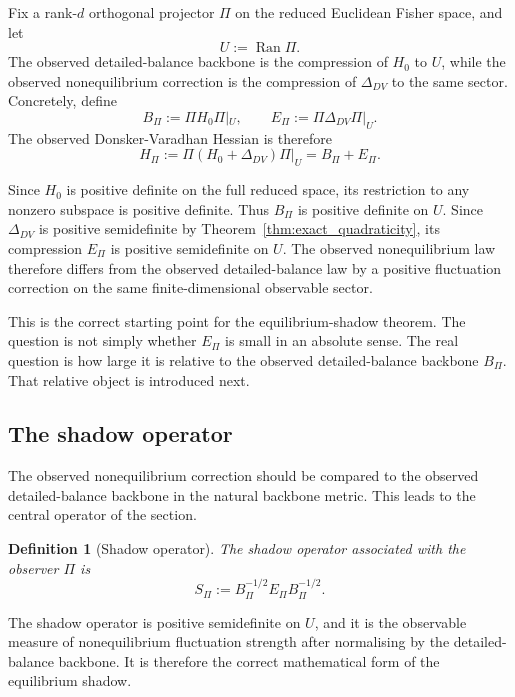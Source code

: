 \documentclass[11pt,a4paper]{article}
\numberwithin{equation}{section}
\theoremstyle{thmcompact}
\newtheorem{definition}[theorem]{Definition}
\theoremstyle{remark}
\begin{document}
Fix a rank-\(d\) orthogonal projector \(\Pi\) on the reduced Euclidean Fisher space, and let
\begin{equation}
U:=\operatorname{Ran}\Pi.
\end{equation}
The observed detailed-balance backbone is the compression of \(H_0\) to \(U\), while the observed nonequilibrium correction is the compression of \(\Delta_{DV}\) to the same sector. Concretely, define
\begin{equation}
B_\Pi:=\Pi H_0\Pi|_{U},
\qquad
E_\Pi:=\Pi\Delta_{DV}\Pi|_{U}.
\end{equation}
The observed Donsker-Varadhan Hessian is therefore
\begin{equation}
H_\Pi:=\Pi(H_0+\Delta_{DV})\Pi|_{U}=B_\Pi+E_\Pi.
\end{equation}

Since \(H_0\) is positive definite on the full reduced space, its restriction to any nonzero subspace is positive definite. Thus \(B_\Pi\) is positive definite on \(U\). Since \(\Delta_{DV}\) is positive semidefinite by Theorem~\ref{thm:exact_quadraticity}, its compression \(E_\Pi\) is positive semidefinite on \(U\). The observed nonequilibrium law therefore differs from the observed detailed-balance law by a positive fluctuation correction on the same finite-dimensional observable sector.

This is the correct starting point for the equilibrium-shadow theorem. The question is not simply whether \(E_\Pi\) is small in an absolute sense. The real question is how large it is relative to the observed detailed-balance backbone \(B_\Pi\). That relative object is introduced next.

\subsection{The shadow operator}

The observed nonequilibrium correction should be compared to the observed detailed-balance backbone in the natural backbone metric. This leads to the central operator of the section.

\begin{definition}[Shadow operator]
\label{def:shadow_operator}
The shadow operator associated with the observer \(\Pi\) is
\begin{equation}
S_\Pi:=B_\Pi^{-1/2}E_\Pi B_\Pi^{-1/2}.
\end{equation}
\end{definition}

The shadow operator is positive semidefinite on \(U\), and it is the observable measure of nonequilibrium fluctuation strength after normalising by the detailed-balance backbone. It is therefore the correct mathematical form of the equilibrium shadow.
\end{document}
